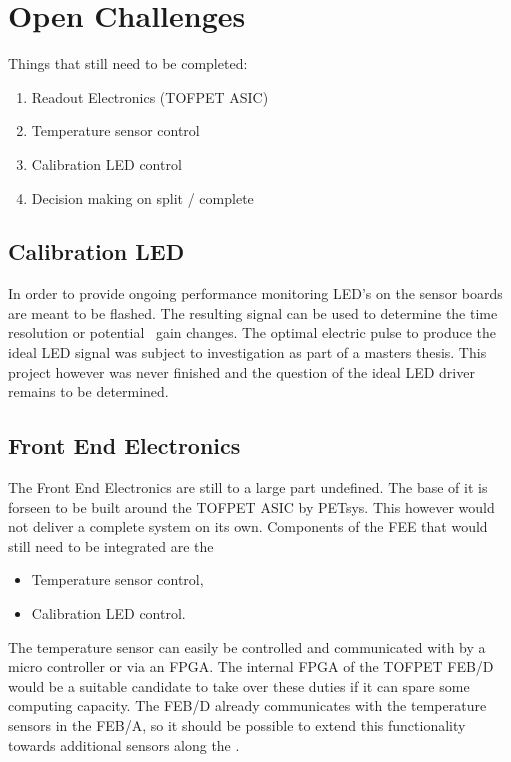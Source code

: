 \documentclass[../BTOF_summary.tex]{subfiles}
\begin{document}
\section{Open Challenges}

Things that still need to be completed:

\begin{enumerate}
    \item Readout Electronics (TOFPET ASIC)
    \item Temperature sensor control 
    \item Calibration LED control
    \item Decision making on split / complete \railboard
\end{enumerate}

\subsection{Calibration LED}

In order to provide ongoing performance monitoring LED's on the sensor boards are meant to be flashed.
The resulting signal can be used to determine the time resolution or potential \sipm\ gain changes.
The optimal electric pulse to produce the ideal LED signal was subject to investigation as part of a masters thesis.
This project however was never finished and the question of the ideal LED driver remains to be determined.

\subsection{Front End Electronics}

The Front End Electronics are still to a large part undefined.
The base of it is forseen to be built around the TOFPET ASIC by PETsys.
This however would not deliver a complete system on its own.
Components of the FEE that would still need to be integrated are the 
\begin{itemize}
    \item Temperature sensor control,
    \item Calibration LED control.
\end{itemize}

The temperature sensor can easily be controlled and communicated with by a micro controller or via an FPGA.
The internal FPGA of the TOFPET FEB/D would be a suitable candidate to take over these duties if it can spare some computing capacity.
The FEB/D already communicates with the temperature sensors in the FEB/A, so it should be possible to extend this functionality towards additional sensors along the \railboard .
\end{document}
